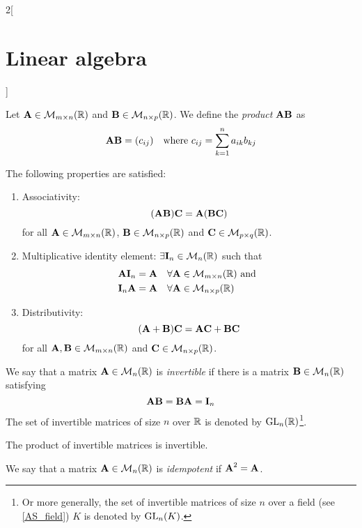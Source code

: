 \documentclass[../../../main_math.tex]{subfiles}
\begin{document}
\begin{multicols}{2}[\section{Linear algebra}]
\begin{proposition}
\begin{enumerate}
    \end{enumerate}
  \end{proposition}
  \begin{definition}
    Let $\boldsymbol{\mathrm{A}}\in\mathcal{M}_{m\times n}(\mathbb{R})$ and $\boldsymbol{\mathrm{B}}\in\mathcal{M}_{n\times p}(\mathbb{R})$. We define the \emph{product} $\boldsymbol{\mathrm{A}}\boldsymbol{\mathrm{B}}$ as $$\boldsymbol{\mathrm{A}}\boldsymbol{\mathrm{B}}=(c_{ij})\quad\text{where }c_{ij}=\sum_{k=1}^na_{ik}b_{kj}$$
  \end{definition}
  \begin{proposition}
    The following properties are satisfied:
    \begin{enumerate}
      \item Associativity: $$(\boldsymbol{\mathrm{A}}\boldsymbol{\mathrm{B}})\boldsymbol{\mathrm{C}}=\boldsymbol{\mathrm{A}}(\boldsymbol{\mathrm{B}}\boldsymbol{\mathrm{C}})$$ for all $\boldsymbol{\mathrm{A}}\in\mathcal{M}_{m\times n}(\mathbb{R})$, $\boldsymbol{\mathrm{B}}\in\mathcal{M}_{n\times p}(\mathbb{R})$ and $\boldsymbol{\mathrm{C}}\in\mathcal{M}_{p\times q}(\mathbb{R})$.
      \item Multiplicative identity element: $\exists\boldsymbol{\mathrm{I}}_n\in\mathcal{M}_n(\mathbb{R})$ such that
            \begin{align*}
               & \boldsymbol{\mathrm{A}}\boldsymbol{\mathrm{I}}_n=\boldsymbol{\mathrm{A}}\quad\forall\boldsymbol{\mathrm{A}}\in\mathcal{M}_{m\times n}(\mathbb{R})\text{ and } \\
               & \boldsymbol{\mathrm{I}}_n\boldsymbol{\mathrm{A}}=\boldsymbol{\mathrm{A}}\quad\forall\boldsymbol{\mathrm{A}}\in\mathcal{M}_{n\times p}(\mathbb{R})
            \end{align*}
      \item Distributivity: $$(\boldsymbol{\mathrm{A}}+\boldsymbol{\mathrm{B}})\boldsymbol{\mathrm{C}}=\boldsymbol{\mathrm{A}}\boldsymbol{\mathrm{C}}+\boldsymbol{\mathrm{B}}\boldsymbol{\mathrm{C}}$$ for all $\boldsymbol{\mathrm{A}},\boldsymbol{\mathrm{B}}\in\mathcal{M}_{m\times n}(\mathbb{R})$ and $\boldsymbol{\mathrm{C}}\in\mathcal{M}_{n\times p}(\mathbb{R})$.
    \end{enumerate}
  \end{proposition}
  \begin{definition}
    We say that a matrix $\boldsymbol{\mathrm{A}}\in\mathcal{M}_n(\mathbb{R})$ is \emph{invertible} if there is a matrix $\boldsymbol{\mathrm{B}}\in\mathcal{M}_n(\mathbb{R})$ satisfying $$\boldsymbol{\mathrm{A}}\boldsymbol{\mathrm{B}}=\boldsymbol{\mathrm{B}}\boldsymbol{\mathrm{A}}=\boldsymbol{\mathrm{I}}_n$$
    The set of invertible matrices of size $n$ over $\mathbb{R}$ is denoted by $\mathrm{GL}_n(\mathbb{R})$\footnote{Or more generally, the set of invertible matrices of size $n$ over a field (see \cref{AS_field}) $K$ is denoted by $\mathrm{GL}_n(K)$.}.
  \end{definition}
  \begin{lemma}
    The product of invertible matrices is invertible.
  \end{lemma}
  \begin{definition}
    We say that a matrix $\boldsymbol{\mathrm{A}}\in\mathcal{M}_n(\mathbb{R})$ is \emph{idempotent} if $\boldsymbol{\mathrm{A}}^2=\boldsymbol{\mathrm{A}}$.
  \end{definition}

\end{multicols}
\end{document}

